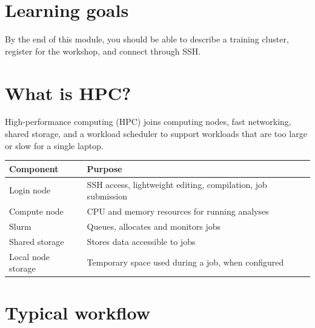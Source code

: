 \documentclass[
]{book}
\newcounter{none} %
\begin{document}
\section{Learning goals}\label{learning-goals}

By the end of this module, you should be able to describe a training cluster, register for the workshop, and connect through SSH.

\section{What is HPC?}\label{what-is-hpc}

High-performance computing (HPC) joins computing nodes, fast networking, shared storage, and a workload scheduler to support workloads that are too large or slow for a single laptop.

{\def\LTcaptype{none} %
\begin{longtable}[]{@{}
  >{\raggedright\arraybackslash}p{}
  >{\raggedright\arraybackslash}p{}@{}}
\toprule\noalign{}
\begin{minipage}[b]{\linewidth}\raggedright
Component
\end{minipage} & \begin{minipage}[b]{\linewidth}\raggedright
Purpose
\end{minipage} \\
\midrule\noalign{}
\endhead
\bottomrule\noalign{}
\endlastfoot
Login node & SSH access, lightweight editing, compilation, job submission \\
Compute node & CPU and memory resources for running analyses \\
Slurm & Queues, allocates and monitors jobs \\
Shared storage & Stores data accessible to jobs \\
Local node storage & Temporary space used during a job, when configured \\
\end{longtable}
}

\section{Typical workflow}\label{typical-workflow}
\end{document}
